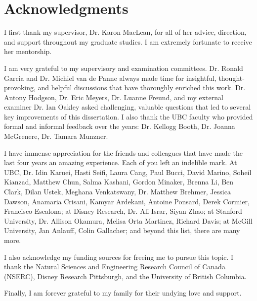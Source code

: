 
\chapter{Acknowledgments}

I first thank my supervisor, Dr. Karon MacLean, for all of her advice, direction, and support throughout my graduate studies.
I am extremely fortunate to receive her mentorship.

I am very grateful to my supervisory and examination committees. Dr. Ronald Garcia and Dr. Michiel van de Panne always made time for insightful, thought-provoking, and helpful discussions that have thoroughly enriched this work.
Dr. Antony Hodgson, Dr. Eric Meyers, Dr. Luanne Freund, and my external examiner Dr. Ian Oakley asked challenging, valuable questions that led to several key improvements of this dissertation.
I also thank the UBC faculty who provided formal and informal feedback over the years: Dr. Kellogg Booth, Dr. Joanna McGrenere, Dr. Tamara Munzner.

I have immense appreciation for the friends and colleagues that have made the last four years an amazing experience.
Each of you left an indelible mark.
At UBC, Dr. Idin Karuei, Hasti Seifi, Laura Cang, Paul Bucci,  David Marino, Soheil Kianzad, Matthew Chun, Salma Kashani, Gordon Minaker, Brenna Li,  Ben Clark, Dilan Ustek, Meghana Venkatswany, Dr. Matthew Brehmer, Jessica Dawson, Anamaria Crisani, Kamyar Ardekani, Antoine Ponsard, Derek Cormier, Francisco Escalona;
at Disney Research, Dr. Ali Israr, Siyan Zhao; 
at Stanford University, Dr. Allison Okamura, Melisa Orta Martinez, Richard Davis;
at McGill University, Jan Anlauff, Colin Gallacher;
and beyond this list, there are many more.

I also acknowledge my funding sources for freeing me to pursue this topic.
I thank the Natural Sciences and Engineering Research Council of Canada (NSERC), Disney Research Pittsburgh, and the University of British Columbia.

Finally, I am forever grateful to my family for their undying love and support.
